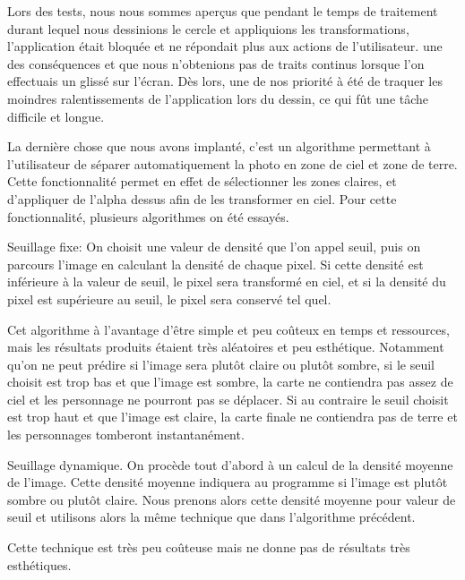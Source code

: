 \documentclass{report}
\begin{document}
Lors des tests, nous nous sommes aperçus que pendant le temps de traitement durant lequel nous dessinions le cercle et appliquions les transformations, l’application était bloquée et ne répondait plus aux actions de l’utilisateur. une des conséquences et que nous n’obtenions pas de traits continus lorsque l’on effectuais un glissé sur l’écran. Dès lors, une de nos priorité à été de traquer les moindres ralentissements de l’application lors du dessin, ce qui fût une tâche difficile et longue.

La dernière chose que nous avons implanté, c’est un algorithme permettant à l’utilisateur de séparer automatiquement la photo en zone de ciel et zone de terre. Cette fonctionnalité permet en effet de sélectionner les zones claires, et d’appliquer de l’alpha dessus afin de les transformer en ciel. Pour cette fonctionnalité, plusieurs algorithmes on été essayés.

Seuillage fixe:
On choisit une valeur de densité que l’on appel seuil, puis on parcours l’image en calculant la densité de chaque pixel. Si cette densité est inférieure à la valeur de seuil, le pixel sera transformé en ciel, et si la densité du pixel est supérieure au seuil, le pixel sera conservé tel quel.

Cet algorithme à l’avantage d’être simple et peu coûteux en temps et ressources, mais les résultats produits étaient très aléatoires et peu esthétique. Notamment qu’on ne peut prédire si l’image sera plutôt claire ou plutôt sombre, si le seuil choisit est trop bas et que l’image est sombre, la carte ne contiendra pas assez de ciel et les personnage ne pourront pas se déplacer. Si au contraire le seuil choisit est trop haut et que l’image est claire, la carte finale ne contiendra pas de terre et les personnages tomberont instantanément.

Seuillage dynamique.
On procède tout d’abord à un calcul de la densité moyenne de l’image. Cette densité moyenne indiquera au programme si l’image est plutôt sombre ou plutôt claire. Nous prenons alors cette densité moyenne pour valeur de seuil et utilisons alors la même technique que dans l’algorithme précédent.

Cette technique est très peu coûteuse mais ne donne pas de résultats très esthétiques.
\end{document}
